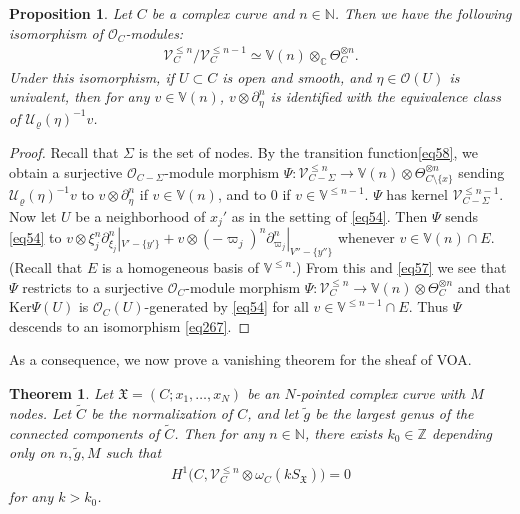 \documentclass[12pt,b5paper,notitlepage]{report}
\theoremstyle{definition}
\theoremstyle{plain}
\newtheorem{thm}[df]{Theorem}
\newtheorem{pp}[df]{Proposition}
\newcommand{\fk}{\mathfrak}
\newcommand{\mc}{\mathcal}
\newcommand{\wtd}{\widetilde}
\newcommand{\scr}{\mathscr}
\newcommand{\SX}{S_{\fk X}}
\newcommand{\Vbb}{\mathbb V}
\newcommand{\Cbb}{\mathbb C}
\newcommand{\Nbb}{\mathbb N}
\newcommand{\Zbb}{\mathbb Z}
\newcommand{\Ker}{\mathrm{Ker}}
\numberwithin{equation}{section}
\begin{document}
\begin{pp}\label{lb22}
Let $C$ be a complex curve and $n\in\Nbb$. Then we have the following isomorphism of  $\scr O_C$-modules:
\begin{align}
\scr V_C^{\leq n}/\scr V_C^{\leq n-1}\simeq\Vbb(n)\otimes_{\Cbb}\Theta_C^{\otimes n}.\label{eq267}
\end{align}
Under this isomorphism, if $U\subset C$ is open and smooth, and $\eta\in\scr O(U)$ is univalent, then for any $v\in\Vbb(n)$, $v\otimes \partial_\eta^n$ is identified with the equivalence class of $\mc U_\varrho(\eta)^{-1}v$.
\end{pp}

\begin{proof}
Recall that $\Sigma$ is the set of nodes. By the transition function\eqref{eq58}, we obtain a surjective $\scr O_{C-\Sigma}$-module morphism $\Psi:\scr V_{C-\Sigma}^{\leq n}\rightarrow\Vbb(n)\otimes\Theta_{C\setminus\{x\}}^{\otimes n}$ sending $\mc U_\varrho(\eta)^{-1}v$ to $v\otimes \partial_\eta^n$ if $v\in\Vbb(n)$, and to $0$ if $v\in\Vbb^{\leq n-1}$. $\Psi$ has kernel $\scr V_{C-\Sigma}^{\leq n-1}$. Now let $U$ be a neighborhood of $x_j'$ as in the setting of \eqref{eq54}. Then $\Psi$ sends \eqref{eq54} to $v\otimes \xi_j^n\partial_{\xi_j}^n|_{V'-\{y'\}}+v\otimes(-\varpi_j)^n\partial_{\varpi_j}^n|_{V''-\{y''\}}$ whenever $v\in\Vbb(n)\cap E$. (Recall that $E$ is a homogeneous basis of $\Vbb^{\leq n}$.) From this and \eqref{eq57} we see that $\Psi$ restricts to a surjective $\scr O_C$-module morphism $\Psi:\scr V_C^{\leq n}\rightarrow\Vbb(n)\otimes\Theta_C^{\otimes n}$ and that $\Ker\Psi(U)$ is $\scr O_C(U)$-generated by  \eqref{eq54} for all $v\in \Vbb^{\leq n-1}\cap E$. Thus $\Psi$ descends to an isomorphism \eqref{eq267}.
\end{proof}



As a consequence, we now prove a vanishing theorem for the sheaf of VOA.

\begin{thm}\label{lb21}
Let $\fk X=(C;x_1,\dots,x_N)$ be an $N$-pointed complex curve with $M$ nodes.  Let  $\wtd C$ be the normalization of $C$, and let $\wtd g$ be the largest genus of the connected components of $\wtd C$.  Then for any $n\in\Nbb$, there exists $k_0\in\Zbb$ depending only on $n,\wtd g,M$ such that 
\begin{align}
H^1\big(C,\scr V_C^{\leq n}\otimes\omega_C(k\SX)\big)=0\label{eq59}
\end{align}
for any $k>k_0$.
\end{thm}
\end{document}
